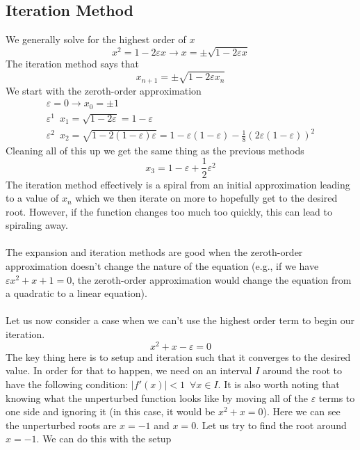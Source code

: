 \documentclass{article}
\begin{document}
\subsection{Iteration Method}
We generally solve for the highest order of $x$ 
\begin{equation*}
    x^2=1-2\varepsilon x \rightarrow x=\pm \sqrt{1-2\varepsilon x}
\end{equation*}
The iteration method says that 
\begin{equation*}
    x_{n+1}=\pm \sqrt{1-2\varepsilon x_n}
\end{equation*}
We start with the zeroth-order approximation 
\begin{equation*}
    \begin{split}
        \varepsilon=0 \rightarrow x_0=\pm 1\\
        \varepsilon^1 \,\,\,x_1=\sqrt{1-2\varepsilon} = 1-\varepsilon \\
        \varepsilon^2\,\,\, x_2 = \sqrt{1-2(1-\varepsilon)\varepsilon} = 1-\varepsilon(1-\varepsilon)-\frac{1}{8}(2\varepsilon(1-\varepsilon))^2
    \end{split}
\end{equation*}
Cleaning all of this up we get the same thing as the previous methods 
\begin{equation*}
    x_3=1-\varepsilon+\frac{1}{2}\varepsilon^2
\end{equation*}
The iteration method effectively is a spiral from an initial approximation leading to a value of $x_n$ which we then iterate on more to hopefully get to the desired root. However, if the function changes too much too quickly, this can lead to spiraling away. \\\\
The expansion and iteration methods are good when the zeroth-order approximation doesn't change the nature of the equation (e.g., if we have $\varepsilon x^2+x+1=0$, the zeroth-order approximation would change the equation from a quadratic to a linear equation).
\\\\
Let us now consider a case when we can't use the highest order term to begin our iteration.
\begin{equation*}
    x^2+x-\varepsilon=0
\end{equation*}
The key thing here is to setup and iteration such that it converges to the desired value. In order for that to happen, we need on an interval $I$ around the root to have the following condition: $|f'(x)|<1\,\,\,\forall x\in I$. It is also worth noting that knowing what the unperturbed function looks like by moving all of the $\varepsilon$ terms to one side and ignoring it (in this case, it would be $x^2+x=0$). Here we can see the unperturbed roots are $x=-1$ and $x=0$. Let us try to find the root around $x=-1$. We can do this with the setup 
\end{document}
